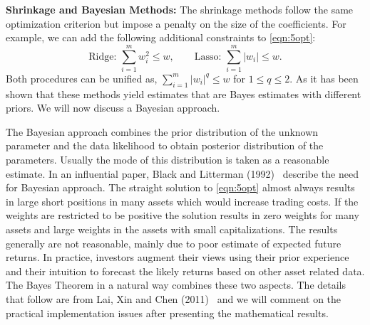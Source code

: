 \noindent\textbf{Shrinkage and Bayesian Methods:} The shrinkage methods follow the same optimization criterion but impose a penalty on the size of the coefficients. For example, we can add the following additional constraints to \eqref{eqn:5opt}:
	\begin{equation} \label{eqn:addconstraint}
	\text{Ridge: } \sum_{i=1}^m w_i^2 \leq w, \qquad \text{Lasso: } \sum_{i=1}^m |w_i| \leq w.
	\end{equation}
Both procedures can be unified as, $\sum_{i=1}^m |w_i|^q \leq w$ for $1 \leq q \leq 2$. As it has been shown that these methods yield estimates that are Bayes estimates with different priors. We will now discuss a Bayesian approach. 


The Bayesian approach combines the prior distribution of the unknown parameter and the data likelihood to obtain posterior distribution of the parameters. Usually the mode of this distribution is taken as a reasonable estimate. In an influential paper, Black and Litterman (1992)~\cite{blacklit} describe the need for Bayesian approach. The straight solution to \eqref{eqn:5opt} almost always results in large short positions in many assets which would increase trading costs. If the weights are restricted to be positive the solution results in zero weights for many assets and large weights in the assets with small capitalizations. The results generally are not reasonable, mainly due to poor estimate of expected future returns. In practice, investors augment their views using their prior experience and their intuition to forecast the likely returns based on other asset related data. The Bayes Theorem in a natural way combines these two aspects. The details that follow are from Lai, Xin and Chen (2011)~\cite{laixingchen} and we will comment on the practical implementation issues after presenting the mathematical results. 


